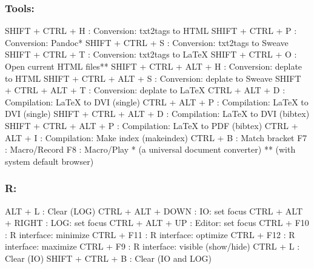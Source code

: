 \newpage
\subsubsection{Tools:}

\vspace{-0.5cm}
\begin{Rtables}[caption={[Tools menu keyboard shortcuts]
    ToolsMenu keyboard shortcuts},
  label=menu:tools]
  SHIFT + CTRL + H        : Conversion: txt2tags to HTML
  SHIFT + CTRL + P        : Conversion: Pandoc*
  SHIFT + CTRL + S        : Conversion: txt2tags to Sweave
  SHIFT + CTRL + T        : Conversion: txt2tags to LaTeX
  SHIFT + CTRL + O        : Open current HTML files**
  SHIFT + CTRL + ALT + H  : Conversion: deplate to HTML
  SHIFT + CTRL + ALT + S  : Conversion: deplate to Sweave
  SHIFT + CTRL + ALT + T  : Conversion: deplate to LaTeX
  CTRL  + ALT  + D        : Compilation: LaTeX to DVI (single)
  CTRL  + ALT  + P        : Compilation: LaTeX to DVI (single)
  SHIFT + CTRL + ALT + D  : Compilation: LaTeX to DVI (bibtex)
  SHIFT + CTRL + ALT + P  : Compilation: LaTeX to PDF (bibtex)
  CTRL  + ALT  + I        : Compilation: Make index (makeindex)
  CTRL  + B               : Match bracket
  F7                      : Macro/Record
  F8                      : Macro/Play
  *  (a universal document converter)
  ** (with system default browser)
\end{Rtables}


\subsubsection{R:}

\vspace{-0.5cm}
\begin{Rtables}[caption={[R menu keyboard shortcuts]
    R menu keyboard shortcuts},
  label=menu:r]
  ALT  + L               : Clear (LOG)
  CTRL + ALT + DOWN      : IO: set focus
  CTRL + ALT + RIGHT     : LOG: set focus
  CTRL + ALT + UP        : Editor: set focus
  CTRL + F10             : R interface: minimize
  CTRL + F11             : R interface: optimize
  CTRL + F12             : R interface: maximize
  CTRL + F9              : R interface: visible (show/hide)
  CTRL + L               : Clear (IO)
  SHIFT + CTRL + B       : Clear (IO and LOG)
\end{Rtables}


